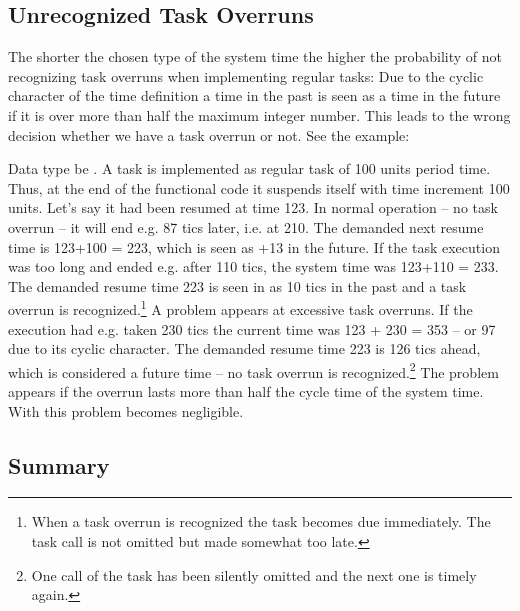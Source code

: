 \subsection{Unrecognized Task Overruns}

The shorter the chosen type of the system time the higher the probability
of not recognizing task overruns when implementing regular tasks: Due to
the cyclic character of the time definition a time in the past is seen as
a time in the future if it is over more than half the maximum integer
number. This leads to the wrong decision whether we have a task overrun or
not. See the example:

Data type be . A task is implemented as regular task of
100 units period time. Thus, at the end of the functional code it suspends
itself with time increment 100 units. Let's say it had been resumed at
time 123. In normal operation -- no task overrun -- it will end e.g. 87
tics later, i.e. at 210. The demanded next resume time is 123+100 = 223,
which is seen as +13 in the future. If the task execution was too long and
ended e.g. after 110 tics, the system time was 123+110 = 233. The demanded
resume time 223 is seen in as 10 tics in the past and a task overrun is
recognized.\footnote{When a task overrun is recognized the task becomes
due immediately. The task call is not omitted but made somewhat too late.}
A problem appears at excessive task overruns. If the execution had e.g.
taken 230 tics the current time was 123 + 230 = 353 -- or 97 due to its
cyclic character. The demanded resume time 223 is 126 tics ahead, which is
considered a future time -- no task overrun is recognized.\footnote{One
call of the task has been silently omitted and the next one is timely
again.} The problem appears if the overrun lasts more than half the cycle
time of the system time. With  this problem becomes
negligible.


\subsection{Summary}

